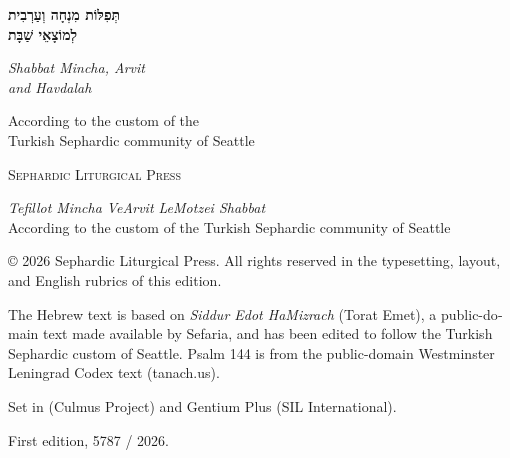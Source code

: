 
\thispagestyle{empty}
\vspace*{\fill}
\begin{center}
  {\Large\bfseries תְּפִלּוֹת מִנְחָה וְעַרְבִית\\ לְמוֹצָאֵי שַׁבָּת\par}
  \medskip
  \begin{otherlanguage}{english}
    {\large\itshape Shabbat Mincha, Arvit\\ and Havdalah\par}
    \bigskip
    {\small According to the custom of the\\
     Turkish Sephardic community of Seattle\par}
  \end{otherlanguage}
\end{center}
\vspace*{\fill}
\begin{center}
  \begin{otherlanguage}{english}
    {\small\scshape Sephardic Liturgical Press\par}
  \end{otherlanguage}
\end{center}
\clearpage

\thispagestyle{empty}
\begin{otherlanguage}{english}
\footnotesize\raggedright
\vspace*{\fill}

\textit{Tefillot Mincha VeArvit LeMotzei Shabbat}\\
According to the custom of the Turkish Sephardic community of Seattle

\medskip
© 2026 Sephardic Liturgical Press. All rights reserved in the typesetting,
layout, and English rubrics of this edition.

\medskip
The Hebrew text is based on \textit{Siddur Edot HaMizrach} (Torat Emet), a
public-domain text made available by Sefaria, and has been edited to follow
the Turkish Sephardic custom of Seattle. Psalm 144 is from the public-domain
Westminster Leningrad Codex text (tanach.us).

\medskip
Set in \pressHebrewFontName{} (Culmus Project) and Gentium Plus
(SIL International).

\medskip
First edition, 5787 / 2026.

\vspace*{\fill}
\end{otherlanguage}

